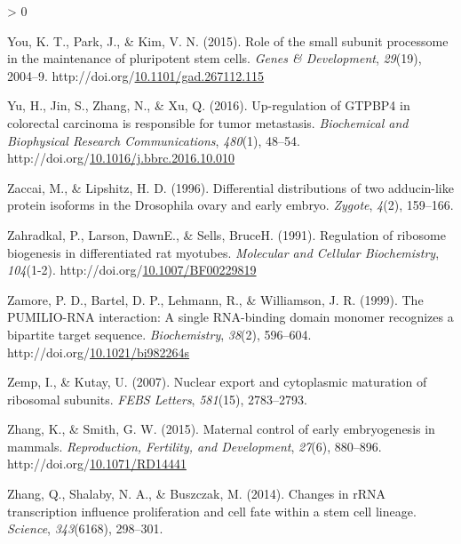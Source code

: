\documentclass[12pt,oneside]{reedthesis}
\newlength{\cslhangindent}
\newenvironment{CSLReferences}[2] %
 {%
  \setlength{\parindent}{0pt}
  \ifodd #1 \everypar{\setlength{\hangindent}{\cslhangindent}}\ignorespaces\fi
  \ifnum #2 > 0
  \setlength{\parskip}{#2\baselineskip}
  \fi
 }%
 {}
\begin{document}
\begin{CSLReferences}{1}{0}
\leavevmode\hypertarget{ref-You2015}{}%
You, K. T., Park, J., \& Kim, V. N. (2015). Role of the small subunit processome in the maintenance of pluripotent stem cells. \emph{Genes \& Development}, \emph{29}(19), 2004--9. http://doi.org/\href{https://doi.org/10.1101/gad.267112.115}{10.1101/gad.267112.115}

\leavevmode\hypertarget{ref-yuUpregulationGTPBP4Colorectal2016}{}%
Yu, H., Jin, S., Zhang, N., \& Xu, Q. (2016). Up-regulation of {GTPBP4} in colorectal carcinoma is responsible for tumor metastasis. \emph{Biochemical and Biophysical Research Communications}, \emph{480}(1), 48--54. http://doi.org/\href{https://doi.org/10.1016/j.bbrc.2016.10.010}{10.1016/j.bbrc.2016.10.010}

\leavevmode\hypertarget{ref-Zaccai1996a}{}%
Zaccai, M., \& Lipshitz, H. D. (1996). Differential distributions of two adducin-like protein isoforms in the {Drosophila} ovary and early embryo. \emph{Zygote}, \emph{4}(2), 159--166.

\leavevmode\hypertarget{ref-zahradkalRegulationRibosomeBiogenesis1991}{}%
Zahradkal, P., Larson, DawnE., \& Sells, BruceH. (1991). Regulation of ribosome biogenesis in differentiated rat myotubes. \emph{Molecular and Cellular Biochemistry}, \emph{104}(1-2). http://doi.org/\href{https://doi.org/10.1007/BF00229819}{10.1007/BF00229819}

\leavevmode\hypertarget{ref-Zamore1999b}{}%
Zamore, P. D., Bartel, D. P., Lehmann, R., \& Williamson, J. R. (1999). The {PUMILIO-RNA} interaction: A single {RNA-binding} domain monomer recognizes a bipartite target sequence. \emph{Biochemistry}, \emph{38}(2), 596--604. http://doi.org/\href{https://doi.org/10.1021/bi982264s}{10.1021/bi982264s}

\leavevmode\hypertarget{ref-Zemp2007}{}%
Zemp, I., \& Kutay, U. (2007). Nuclear export and cytoplasmic maturation of ribosomal subunits. \emph{FEBS Letters}, \emph{581}(15), 2783--2793.

\leavevmode\hypertarget{ref-Zhang2015c}{}%
Zhang, K., \& Smith, G. W. (2015). Maternal control of early embryogenesis in mammals. \emph{Reproduction, Fertility, and Development}, \emph{27}(6), 880--896. http://doi.org/\href{https://doi.org/10.1071/RD14441}{10.1071/RD14441}

\leavevmode\hypertarget{ref-Zhang2014d}{}%
Zhang, Q., Shalaby, N. A., \& Buszczak, M. (2014). Changes in {rRNA} transcription influence proliferation and cell fate within a stem cell lineage. \emph{Science}, \emph{343}(6168), 298--301.


\end{CSLReferences}
\end{document}
